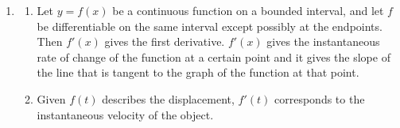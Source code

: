 \documentclass[a4paper, 12pt]{article}
\begin{document}
\begin{enumerate}[leftmargin=*,label=\textbf{\arabic*.}]
\begin{enumerate}[leftmargin=*,label=\textbf{\alph*.}]
$ e^{x^2}$ grows at a higher rate than $x$. Therefore, $f$ is decreasing. The expressions are continuous for $x>1$. We may now apply the Integral Test. Handle the improper integral with the limit.
\[\int_1^\infty\frac x{ e^{x^2}}\,dx=\lim_{R\to\infty}-\frac12 e^{-x^2}\bigg|_1^R=\lim_{R\to\infty}-\frac12\left( e^{-R^2}- e^{-1}\right)=\frac1{2 e}\quad\left(\text{converges}\right)\]

By the Integral Test, the series $\boxed{\text{converges}}$.
\end{enumerate}

\item \begin{enumerate}[leftmargin=*,label=\textbf{\alph*.}]
\item Let $y=f(x)$ be a continuous function on a bounded interval, and let $f$ be differentiable on the same interval except possibly at the endpoints. Then $f'(x)$ gives the first derivative. $f'(x)$ gives the instantaneous rate of change of the function at a certain point and it gives the slope of the line that is tangent to the graph of the function at that point.

\item Given $f(t)$ describes the displacement, $f'(t)$ corresponds to the instantaneous velocity of the object.
\end{enumerate}
\end{enumerate}
\end{document}
